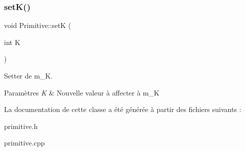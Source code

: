 \subsubsection{\texorpdfstring{set\+K()}{setK()}}
{\footnotesize\ttfamily void Primitive\+::setK (\begin{DoxyParamCaption}\item[{int}]{K }\end{DoxyParamCaption})}



Setter de m\+\_\+K. 


\begin{DoxyParams}{Paramètres}
{\em K} & Nouvelle valeur à affecter à m\+\_\+K \\
\hline
\end{DoxyParams}


La documentation de cette classe a été générée à partir des fichiers suivants \+:\begin{DoxyCompactItemize}
\item 
primitive.\+h\item 
primitive.\+cpp\end{DoxyCompactItemize}
